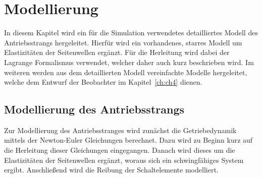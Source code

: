\chapter{Modellierung}\label{ch:ch2}
In diesem Kapitel wird ein für die Simulation verwendetes detailliertes Modell des Antriebsstrangs hergeleitet. Hierfür wird ein vorhandenes, starres Modell um Elastizitäten der Seitenwellen ergänzt. Für die Herleitung wird dabei der Lagrange Formalismus verwendet, welcher daher auch kurz beschrieben wird. Im weiteren werden aus dem detaillierten Modell vereinfachte Modelle hergeleitet, welche dem Entwurf der Beobachter im Kapitel~\ref{ch:ch4} dienen.


\section{Modellierung des Antriebsstrangs}
Zur Modellierung des Antriebsstranges wird zunächst die Getriebedynamik mittels der Newton-Euler Gleichungen berechnet. Dazu wird zu Beginn kurz auf die Herleitung dieser Gleichungen eingegangen. Danach wird dieses um die Elastizitäten der Seitenwellen ergänzt, woraus sich ein schwingfähiges System ergibt. Anschließend wird die Reibung der Schaltelemente modelliert.  

